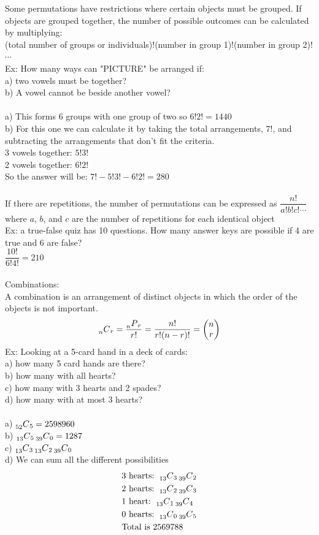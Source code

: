 \documentclass[11pt, fleqn]{article}
\begin{document}
Some permutations have restrictions where certain objects must be grouped. If objects are grouped together, the number of possible outcomes can be calculated by multiplying:\\
(total number of groups or individuals)!(number in group 1)!(number in group 2)!$\cdots$\\
Ex: How many ways can "PICTURE" be arranged if:\\
a) two vowels must be together?\\
b) A vowel cannot be beside another vowel?\\
\\
a) This forms 6 groups with one group of two so $6!2!=1440$\\
b) For this one we can calculate it by taking the total arrangements, $7!$, and subtracting the arrangements that don't fit the criteria.\\
3 vowels together: $5!3!$\\
2 vowels together: $6!2!$\\
So the answer will be: $7!-5!3!-6!2!=280$\\
\\
If there are repetitions, the number of permutations can be expressed as $\dfrac{n!}{a!b!c!\cdots}$ where $a$, $b$, and $c$ are the number of repetitions for each identical object\\
Ex: a true-false quiz has 10 questions. How many answer keys are possible if 4 are true and 6 are false?\\
$\dfrac{10!}{6!4!}=210$\\
\\
Combinations:\\
A combination is an arrangement of distinct objects in which the order of the objects is not important.
$$\prescript{}{n}{C}_{r}=\frac{\prescript{}{n}{P}_{r}}{r!}=\frac{n!}{r!(n-r)!}=\left(\begin{matrix} n\\r\end{matrix}\right)$$
Ex: Looking at a 5-card hand in a deck of cards:\\
a) how many 5 card hands are there?\\
b) how many with all hearts?\\
c) how many with 3 hearts and 2 spades?\\
d) how many with at most 3 hearts?\\
\\
a) $\prescript{}{52}{C}_{5}=2598960$\\
b) $\prescript{}{13}{C}_{5}\prescript{}{39}{C}_{0}=1287$\\
c) $\prescript{}{13}{C}_{3}\prescript{}{13}{C}_{2}\prescript{}{39}{C}_{0}$\\
d) We can sum all the different possibilities
\begin{align*}
    &\text{3 hearts: }\prescript{}{13}{C}_{3}\prescript{}{39}{C}_{2}\\
    &\text{2 hearts: } \prescript{}{13}{C}_{2}\prescript{}{39}{C}_{3}\\
    &\text{1 heart: }\prescript{}{13}{C}_{1}\prescript{}{39}{C}_{4}\\
    &\text{0 hearts: }\prescript{}{13}{C}_{0}\prescript{}{39}{C}_{5}\\
    &\text{Total is }2569788
\end{align*}
\end{document}
